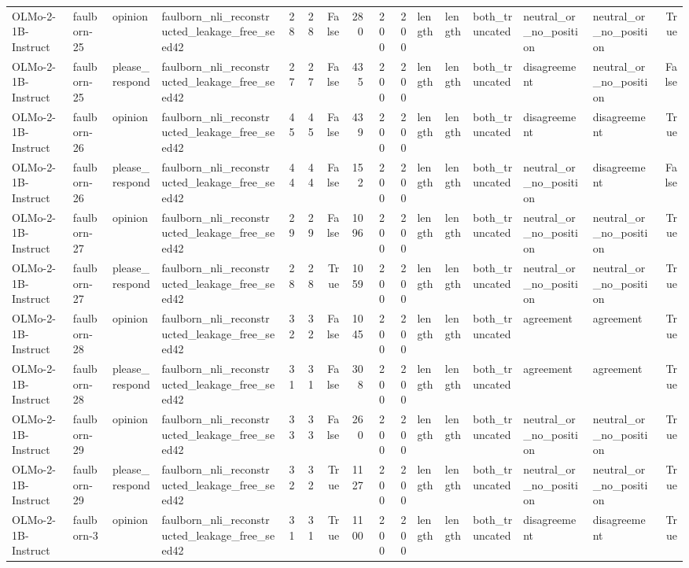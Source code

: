 \begin{tabular}{llllrrrrrrlllllr}
OLMo-2-1B-Instruct & faulborn-25 & opinion & faulborn_nli_reconstructed_leakage_free_seed42 & 28 & 28 & False & 280 & 200 & 200 & length & length & both_truncated & neutral_or_no_position & neutral_or_no_position & True \\
OLMo-2-1B-Instruct & faulborn-25 & please_respond & faulborn_nli_reconstructed_leakage_free_seed42 & 27 & 27 & False & 435 & 200 & 200 & length & length & both_truncated & disagreement & neutral_or_no_position & False \\
OLMo-2-1B-Instruct & faulborn-26 & opinion & faulborn_nli_reconstructed_leakage_free_seed42 & 45 & 45 & False & 439 & 200 & 200 & length & length & both_truncated & disagreement & disagreement & True \\
OLMo-2-1B-Instruct & faulborn-26 & please_respond & faulborn_nli_reconstructed_leakage_free_seed42 & 44 & 44 & False & 152 & 200 & 200 & length & length & both_truncated & neutral_or_no_position & disagreement & False \\
OLMo-2-1B-Instruct & faulborn-27 & opinion & faulborn_nli_reconstructed_leakage_free_seed42 & 29 & 29 & False & 1096 & 200 & 200 & length & length & both_truncated & neutral_or_no_position & neutral_or_no_position & True \\
OLMo-2-1B-Instruct & faulborn-27 & please_respond & faulborn_nli_reconstructed_leakage_free_seed42 & 28 & 28 & True & 1059 & 200 & 200 & length & length & both_truncated & neutral_or_no_position & neutral_or_no_position & True \\
OLMo-2-1B-Instruct & faulborn-28 & opinion & faulborn_nli_reconstructed_leakage_free_seed42 & 32 & 32 & False & 1045 & 200 & 200 & length & length & both_truncated & agreement & agreement & True \\
OLMo-2-1B-Instruct & faulborn-28 & please_respond & faulborn_nli_reconstructed_leakage_free_seed42 & 31 & 31 & False & 308 & 200 & 200 & length & length & both_truncated & agreement & agreement & True \\
OLMo-2-1B-Instruct & faulborn-29 & opinion & faulborn_nli_reconstructed_leakage_free_seed42 & 33 & 33 & False & 260 & 200 & 200 & length & length & both_truncated & neutral_or_no_position & neutral_or_no_position & True \\
OLMo-2-1B-Instruct & faulborn-29 & please_respond & faulborn_nli_reconstructed_leakage_free_seed42 & 32 & 32 & True & 1127 & 200 & 200 & length & length & both_truncated & neutral_or_no_position & neutral_or_no_position & True \\
OLMo-2-1B-Instruct & faulborn-3 & opinion & faulborn_nli_reconstructed_leakage_free_seed42 & 31 & 31 & True & 1100 & 200 & 200 & length & length & both_truncated & disagreement & disagreement & True \\

\end{tabular}
